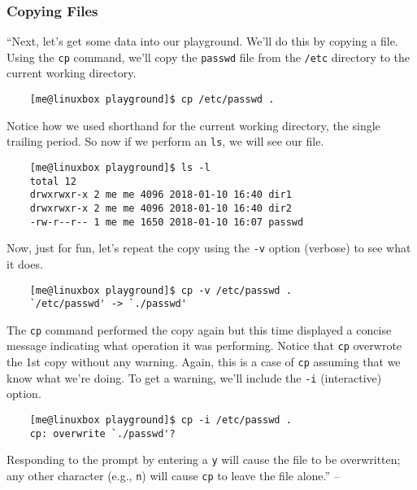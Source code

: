 \documentclass[oneside]{book}
\numberwithin{equation}{section}
\begin{document}
\subsubsection{Copying Files}
``Next, let's get some data into our playground. We'll do this by copying a file. Using the \texttt{cp} command, we'll copy the \texttt{passwd} file from the \texttt{/etc} directory to the current working directory.
\begin{verbatim}
	[me@linuxbox playground]$ cp /etc/passwd .
\end{verbatim}
Notice how we used shorthand for the current working directory, the single trailing period. So now if we perform an \texttt{ls}, we will see our file.
\begin{verbatim}
	[me@linuxbox playground]$ ls -l
	total 12
	drwxrwxr-x 2 me me 4096 2018-01-10 16:40 dir1
	drwxrwxr-x 2 me me 4096 2018-01-10 16:40 dir2
	-rw-r--r-- 1 me me 1650 2018-01-10 16:07 passwd
\end{verbatim}
Now, just for fun, let's repeat the copy using the \texttt{-v} option (verbose) to see what it does.
\begin{verbatim}
	[me@linuxbox playground]$ cp -v /etc/passwd .
	`/etc/passwd' -> `./passwd'
\end{verbatim}
The \texttt{cp} command performed the copy again but this time displayed a concise message indicating what operation it was performing. Notice that \texttt{cp} overwrote the 1st copy without any warning. Again, this is a case of \texttt{cp} assuming that we know what we're doing. To get a warning, we'll include the \texttt{-i} (interactive) option.
\begin{verbatim}
	[me@linuxbox playground]$ cp -i /etc/passwd .
	cp: overwrite `./passwd'?
\end{verbatim}
Responding to the prompt by entering a \texttt{y} will cause the file to be overwritten; any other character (e.g., \texttt{n}) will cause \texttt{cp} to leave the file alone.'' -- \cite[pp. 75--76]{Shotts2019}
\end{document}
